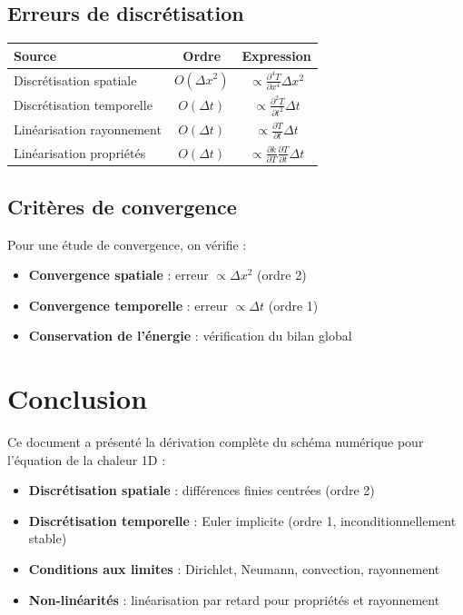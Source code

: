 \documentclass[11pt,a4paper]{article}
\begin{document}
\subsection{Erreurs de discrétisation}

\begin{center}
\begin{tabular}{lcc}
\toprule
\textbf{Source} & \textbf{Ordre} & \textbf{Expression} \\
\midrule
Discrétisation spatiale & $O(\Delta x^2)$ & $\propto \frac{\partial^4 T}{\partial x^4} \Delta x^2$ \\
Discrétisation temporelle & $O(\Delta t)$ & $\propto \frac{\partial^2 T}{\partial t^2} \Delta t$ \\
Linéarisation rayonnement & $O(\Delta t)$ & $\propto \frac{\partial T}{\partial t} \Delta t$ \\
Linéarisation propriétés & $O(\Delta t)$ & $\propto \frac{\partial k}{\partial T} \frac{\partial T}{\partial t} \Delta t$ \\
\bottomrule
\end{tabular}
\end{center}

\subsection{Critères de convergence}

Pour une étude de convergence, on vérifie :

\begin{itemize}
    \item \textbf{Convergence spatiale} : erreur $\propto \Delta x^2$ (ordre 2)
    \item \textbf{Convergence temporelle} : erreur $\propto \Delta t$ (ordre 1)
    \item \textbf{Conservation de l'énergie} : vérification du bilan global
\end{itemize}

\section{Conclusion}

Ce document a présenté la dérivation complète du schéma numérique pour l'équation de la chaleur 1D :

\begin{itemize}
    \item \textbf{Discrétisation spatiale} : différences finies centrées (ordre 2)
    \item \textbf{Discrétisation temporelle} : Euler implicite (ordre 1, inconditionnellement stable)
    \item \textbf{Conditions aux limites} : Dirichlet, Neumann, convection, rayonnement
    \item \textbf{Non-linéarités} : linéarisation par retard pour propriétés et rayonnement
\end{itemize}
\end{document}
